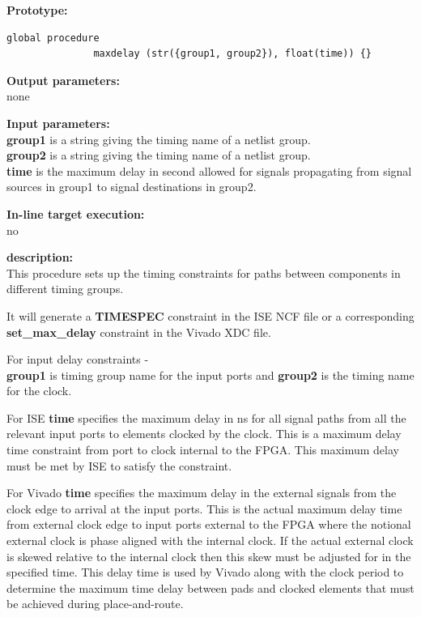             {\bf Prototype:} \\
            \vsp
            \begin{lstlisting}[gobble=12, language=threepl]
               global procedure
               maxdelay (str({group1, group2}), float(time)) {}
            \end{lstlisting}

            {\bf Output parameters:} \\
            none

            {\bf Input parameters:} \\            
            {\bf group1} is a string giving the timing name of a netlist group.\\
            {\bf group2} is a string giving the timing name of a netlist group.\\
            {\bf time} is the maximum delay in second allowed
            for signals propagating from signal sources in group1 to
            signal destinations in group2.
        
            {\bf In-line target execution:} \\
            no

            {\bf description:} \\
            This procedure sets up the timing constraints for paths between
            components in different timing groups.
            
            It will generate a {\bf TIMESPEC} constraint in the ISE NCF file or
            a corresponding {\bf set\_max\_delay} constraint in the Vivado XDC
            file.

            For input delay constraints -\\
            
            {\bf group1} is timing group name for
            the input ports and {\bf group2} is the timing name for the clock.
            
            For ISE {\bf time} specifies the maximum delay in ns for all signal
            paths from all the relevant input ports to elements clocked by the
            clock. This is a maximum delay time constraint from port to clock
            internal to the FPGA. This maximum delay must be met by ISE
            to satisfy the constraint.
            
            For Vivado {\bf time} specifies the maximum delay in the external
            signals from the clock edge to arrival at the input ports.
            This is the actual maximum delay time from external clock edge to
            input ports external to the FPGA where the notional external clock
            is phase aligned with the internal clock. If the actual external
            clock is skewed relative to the internal clock then this skew
            must be adjusted for in the specified time. This delay time is
            used by Vivado along with the clock period to determine the
            maximum time delay between pads and clocked elements that must
            be achieved during place-and-route.


